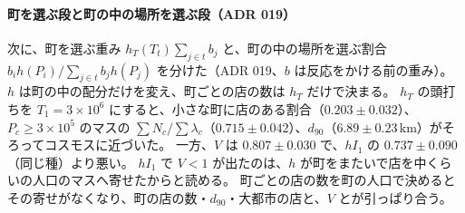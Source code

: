 \documentclass[a4paper,11pt]{ltjsarticle}
\begin{document}
\paragraph{町を選ぶ段と町の中の場所を選ぶ段（ADR 019）}
次に、町を選ぶ重み $h_T(T_t) \sum_{j \in t} b_j$ と、町の中の場所を選ぶ割合 $b_i h(P_i) / \sum_{j \in t} b_j h(P_j)$ を分けた（ADR 019、$b$ は反応をかける前の重み）。
$h$ は町の中の配分だけを変え、町ごとの店の数は $h_T$ だけで決まる。
$h_T$ の頭打ちを $T_1 = 3 \times 10^6$ にすると、小さな町に店のある割合（$0.203 \pm 0.032$）、$P_c \ge 3 \times 10^5$ のマスの $\sum N_c / \sum \lambda_c$（$0.715 \pm 0.042$）、$d_{90}$（$6.89 \pm 0.23\,\mathrm{km}$）がそろってコスモスに近づいた。
一方、$V$ は $0.807 \pm 0.030$ で、$hI_1$ の $0.737 \pm 0.090$（同じ種）より悪い。
$hI_1$ で $V < 1$ が出たのは、$h$ が町をまたいで店を中くらいの人口のマスへ寄せたからと読める。
町ごとの店の数を町の人口で決めるとその寄せがなくなり、町の店の数・$d_{90}$・大都市の店と、$V$ とが引っぱり合う。
\end{document}
